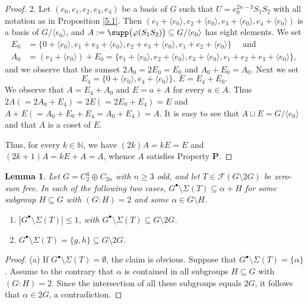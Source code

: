 \documentclass[a4paper, 10pt]{amsart}
\theoremstyle{plain}
\newtheorem{lemma}[theorem]{\bf Lemma}
\theoremstyle{definition}
\newcommand{\N}{\mathbb N}
\numberwithin{equation}{section}
\begin{document}
{\begin{proof}
2. Let $(e_0, e_1,e_2,e_3,e_4)$ be a basis of $G$ such that $U = e_0^{2n-3}S_1S_2$ with all notation as in Proposition \ref{5.1}. Then 
 $(e_1+\langle e_0 \rangle, e_2+\langle e_0 \rangle, e_3+\langle e_0 \rangle, e_4+\langle e_0 \rangle )$ is a basis of $G/\langle e_0 \rangle$, and $A:=\supp \big( \varphi(S_1S_2) \big) \subseteq G/\langle e_0 \rangle$ has eight elements. We set
\[
\begin{aligned}
E_0 & =\{0+\langle e_0 \rangle, e_1+e_3+\langle e_0 \rangle,e_2+e_3+\langle e_0 \rangle,e_1+e_2+\langle e_0 \rangle\} \quad \text{ and} \\ 
A_0 & = (e_1+\langle e_0 \rangle) + E_0 =\{e_1+\langle e_0 \rangle,e_2+\langle e_0 \rangle,e_3+\langle e_0 \rangle,e_1+e_2+e_3+\langle e_0 \rangle\} ,
\end{aligned}
\]
and we observe  that the sumset $2A_0=2E_0=E_0$ and $A_0+E_0=A_0$. Next we set
\[
E_4=\{0+\langle e_0 \rangle,e_4+\langle e_0 \rangle\}, \ E=E_4+E_0.
\]
We observe that $A=E_4+A_0$ and $E=a+A$ for every $a\in A$.
	Thus $2A(=2A_0+E_4)=2E(=2E_0+E_4)=E$ and $A+E(=A_0+E_0+E_4=A_0+E_4)=A$. It is easy to see that $A\sqcup E=G/\langle e_0\rangle$ and that $A$ is a coset of $E$.
	
Thus, for every $k \in \N$, we have
 $(2k)A = kE=E$ and  $(2k+1)A=kE+A=A$, whence $A$ satisfies Property {\bf P}. 
\end{proof}



\begin{lemma}\label{5.4}
	Let $G = C_2^4 \oplus C_{2n}$ with $n\geq 3$ odd, and let $T \in \mathcal F (G\setminus 2G)$ be zero-sum free. In each of the following two cases,  $G^{\bullet} \setminus \Sigma (T) \subseteq \alpha + H$ for some subgroup $H \subseteq G$ with $(G \colon H)=2$ and some $\alpha \in G \setminus H$. 
\begin{enumerate}
\item[(a)]  $|G^{\bullet} \setminus \Sigma (T)| \le 1$, with $G^{\bullet} \setminus \Sigma (T)\subseteq G\setminus 2G$.
		
\item[(b)]  $G^{\bullet}\setminus \Sigma (T)=\{g,h\}\subseteq G\setminus 2G$. 
\end{enumerate}  
\end{lemma}

\begin{proof}
(a)  If $G^{\bullet} \setminus \Sigma (T) = \emptyset$, the claim is obvious. Suppose that $G^{\bullet} \setminus \Sigma (T) = \{\alpha\}$. Assume to the contrary that $\alpha$ is contained in all subgroups $H \subseteq G$ with $(G \colon H)=2$. Since the intersection of all these subgroups equals $2G$, it follows that $\alpha \in 2G$, a contradiction. 
	


\end{proof}}
\end{document}
